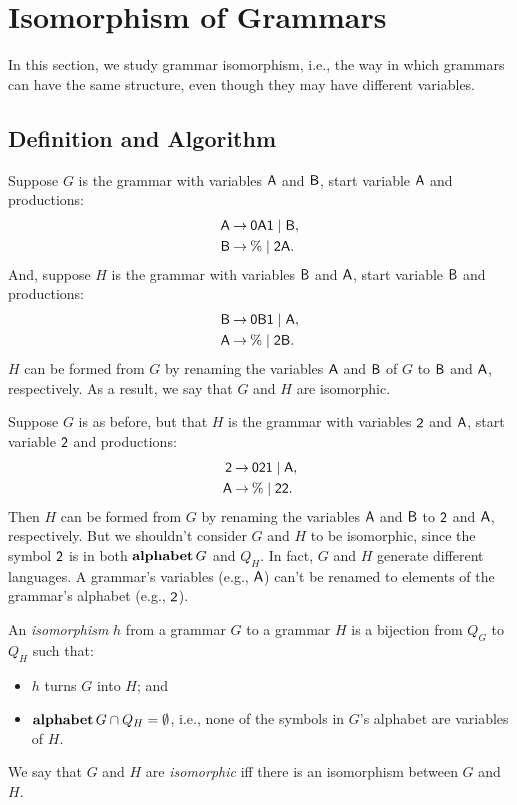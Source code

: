 \section{Isomorphism of Grammars}
\label{IsomorphismOfGrammars}

%
%

In this section, we study grammar isomorphism, i.e., the way in
which grammars can have the same structure, even though they may have
different variables.

\subsection{Definition and Algorithm}

Suppose $G$ is the grammar with variables $\mathsf{A}$ and $\mathsf{B}$,
start variable $\mathsf{A}$ and productions:
\begin{align*}
  \mathsf{A} &\mathbin{\to} \mathsf{0}\mathsf{A}\mathsf{1} \mid \mathsf{B} , \\
  \mathsf{B} &\mathbin{\to} \% \mid \mathsf{2}\mathsf{A} .
\end{align*}
And, suppose $H$ is the grammar with variables $\mathsf{B}$ and $\mathsf{A}$,
start variable $\mathsf{B}$ and productions:
\begin{align*}
  \mathsf{B} &\mathbin{\to} \mathsf{0}\mathsf{B}\mathsf{1} \mid \mathsf{A} , \\
  \mathsf{A} &\mathbin{\to} \% \mid \mathsf{2}\mathsf{B} .
\end{align*}
$H$ can be formed from $G$ by renaming the variables $\mathsf{A}$ and $\mathsf{B}$
of $G$ to $\mathsf{B}$ and $\mathsf{A}$, respectively.  As a result, we say that
$G$ and $H$ are isomorphic.

Suppose $G$ is as before, but that $H$ is the grammar with variables
$\mathsf{2}$ and $\mathsf{A}$, start variable $\mathsf{2}$ and productions:
\begin{align*}
  \mathsf{2} &\mathbin{\to} \mathsf{0}\mathsf{2}\mathsf{1} \mid \mathsf{A} , \\
  \mathsf{A} &\mathbin{\to} \% \mid \mathsf{2}\mathsf{2} .
\end{align*}
Then $H$ can be formed from $G$ by renaming the variables $\mathsf{A}$ and
$\mathsf{B}$ to $\mathsf{2}$ and $\mathsf{A}$, respectively.  But we shouldn't
consider $G$ and $H$ to be isomorphic, since the symbol $\mathsf{2}$ is in
both $\mathbf{alphabet}\,G$ and $Q_H$.  In fact, $G$ and $H$ generate
different languages.  A grammar's variables (e.g., $\mathsf{A}$) can't be
renamed to elements of the grammar's alphabet (e.g., $\mathsf{2}$).

An \emph{isomorphism} $h$ from a grammar $G$ to a grammar $H$ is
a bijection from $Q_G$ to $Q_H$ such that:
\begin{itemize}
\item $h$ turns $G$ into $H$; and

\item $\mathbf{alphabet}\,G\cap Q_H=\emptyset$, i.e., none of the symbols in
  $G$'s alphabet are variables of $H$.
\end{itemize}
We say that $G$ and $H$ are \emph{isomorphic} iff there is an
isomorphism between $G$ and $H$.

